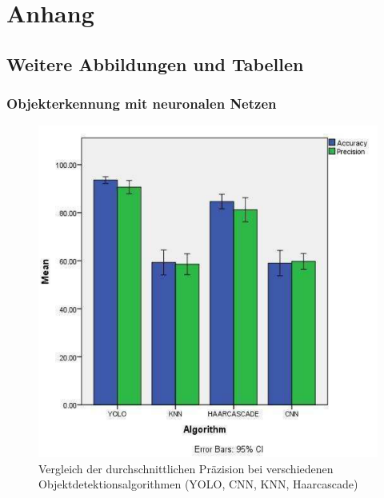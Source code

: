 \chapter{Anhang}
\section{Weitere Abbildungen und Tabellen}
\subsection{Objekterkennung mit neuronalen Netzen}{


    
\begin{figure}[h]
    \centering
    \includegraphics*[scale = 0.35, keepaspectratio]{images/yolo_comp/yolo_mean_prec.png}
    \caption[Vergleich der durchschnittlichen Präzision bei verschiedenen Objektdetektionsalgorithmen (YOLO, CNN, KNN, Haarcascade) ]{Vergleich der durchschnittlichen Präzision bei verschiedenen Objektdetektionsalgorithmen (YOLO, CNN, KNN, Haarcascade) \citep{Pavani2022}}
    \label{scr:comp_obj_det_mean_av}
 \end{figure}
 \begin{figure}[ht]
    \centering
    \begin{subfigure}[b]{0.45\textwidth}
        \centering

\end{subfigure}
\end{figure}}
